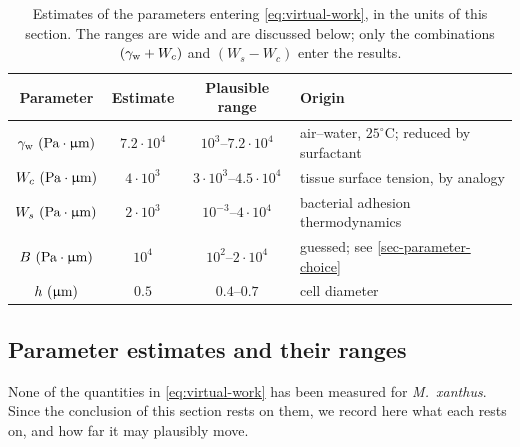 \documentclass[a5paper]{article}
\begin{document}
\begin{table}[h!]
    \centering
    \begin{tabular}{c|c|c|l}
        \hline
        Parameter & Estimate & Plausible range & Origin \\
        \hline
        $\gamma_{\rm w}~(\text{Pa}\cdot\upmu\mathrm{m})$ & $7.2\cdot10^{4}$ & $10^{3}$--$7.2\cdot10^{4}$ & air--water, $25^\circ$C; reduced by surfactant \\
        $W_c~(\text{Pa}\cdot\upmu\mathrm{m})$ & $4\cdot10^{3}$ & $3\cdot10^{3}$--$4.5\cdot10^{4}$ & tissue surface tension, by analogy \\
        $W_s~(\text{Pa}\cdot\upmu\mathrm{m})$ & $2\cdot10^{3}$ & $10^{-3}$--$4\cdot10^{4}$ & bacterial adhesion thermodynamics \\
        $B~(\text{Pa}\cdot\upmu\mathrm{m})$ & $10^{4}$ & $10^{2}$--$2\cdot10^{4}$ & guessed; see \cref{sec-parameter-choice} \\
        $h~(\upmu\mathrm{m})$ & $0.5$ & $0.4$--$0.7$ & cell diameter \\
        \hline
    \end{tabular}
    \caption{Estimates of the parameters entering \eqref{eq:virtual-work}, in the units of this section. The ranges are wide and are discussed below; only the combinations $(\gamma_{\rm w}+W_c)$ and $(W_s-W_c)$ enter the results.}
    \label{tab:extrusion-parameters}
\end{table}

\subsection{Parameter estimates and their ranges}
\label{sec-extrusion-parameters}

None of the quantities in \eqref{eq:virtual-work} has been measured for \emph{M.\ xanthus}. Since the conclusion of this section rests on them, we record here what each rests on, and how far it may plausibly move.
\end{document}

